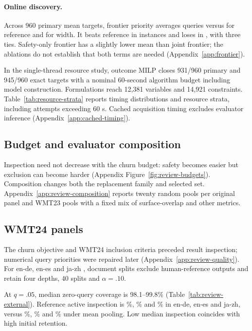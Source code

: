 \documentclass[11pt]{article}
\begin{document}
\paragraph{Online discovery.} Across 960 primary mean targets, frontier priority averages \frontierQueries{} queries versus \frontierRefQueries{} for reference and \frontierWidthQueries{} for width. It beats reference in \frontierWins{} instances and loses in \frontierLosses{}, with three ties. Safety-only frontier has a slightly lower mean than joint frontier; the ablations do not establish that both terms are needed (Appendix~\ref{app:frontier}). 





In the single-thread resource study, outcome MILP closes 931/960 primary and 945/960 exact targets with a nominal 60-second algorithm budget including model construction. Formulations reach 12,381 variables and 14,921 constraints. Table~\ref{tab:resource-strata} reports timing distributions and resource strata, including attempts exceeding 60 s. Cached acquisition timing excludes evaluator inference (Appendix~\ref{app:cached-timing}).

\subsection{Budget and evaluator composition}
Inspection need not decrease with the churn budget: safety becomes easier but exclusion can become harder (Appendix Figure~\ref{fig:review-budgets}). Composition changes both the replacement family and selected set. Appendix~\ref{app:review-composition} reports twenty random pools per original panel and WMT23 pools with a fixed mix of surface-overlap and other metrics.

\subsection{WMT24 panels}
The churn objective and WMT24 inclusion criteria preceded result inspection; numerical query priorities were repaired later (Appendix~\ref{app:review-quality}). For en-de, en-es and ja-zh \citep{freitag2024wmt24}, document splits exclude human-reference outputs and retain four depths, 40 splits and $\alpha=.10$.

At $q=.05$, median zero-query coverage is 98.1--99.8\% (Table~\ref{tab:review-external}). Reference active inspection is \deMedianActive\%, \esMedianActive\% and \zhMedianActive\% in en-de, en-es and ja-zh, versus \deMeanActive\%, \esMeanActive\% and \zhMeanActive\% under mean pooling. Low median inspection coincides with high initial retention.
\end{document}
